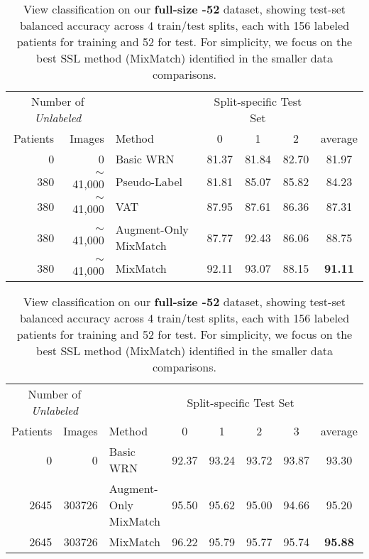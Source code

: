 \begin{table}[!h]
    \centering
    \begin{tabular}{r r l|ccc|c}
    \multicolumn{2}{c}{Number of \emph{Unlabeled}}
    	& 
    	& \multicolumn{3}{c}{Split-specific Test Set}
    \\
    Patients & Images & Method & 0  & 1 & 2 & average\\
    \hline
    0 & 0 & Basic WRN & 81.37 & 81.84 & 82.70 & 81.97\\
    380 & $\sim$41,000  & Pseudo-Label & 81.81 & 85.07 & 85.82 & 84.23\\
    380 &  $\sim$41,000  & VAT & 87.95 & 87.61 & 86.36 & 87.31\\
    380 &  $\sim$41,000  & Augment-Only MixMatch  & 87.77 & 92.43 & 86.06 & 88.75\\
    380 &  $\sim$41,000 & MixMatch & 92.11 & 93.07 & 88.15 & \textbf{91.11}
    \end{tabular}
    \caption{View classification on our \textbf{smaller -18} dataset, showing test-set balanced accuracy across 3 separate train/test splits each with 18 labeled patients for training and 18 for test.
    }%
    \label{tab:view classification small}
\bigskip

    \begin{tabular}{r r l|cccc|c}
    \multicolumn{2}{c}{Number of \emph{Unlabeled}}
    	& 
    	& \multicolumn{4}{c}{Split-specific Test Set}
    \\
    Patients & Images & Method & 0  & 1 & 2 & 3 & average\\
    \hline
	0 & 0 & Basic WRN & 92.37 & 93.24 & 93.72 & 93.87 & 93.30\\
    2645 & 303726 & Augment-Only MixMatch & 95.50 & 95.62 & 95.00 & 94.66 & 95.20\\
    2645 & 303726  & MixMatch & 96.22 & 95.79 & 95.77 & 95.74 & \textbf{95.88}
    \end{tabular}
    \caption{View classification on our \textbf{full-size -52} dataset, showing test-set balanced accuracy across 4 train/test splits, each with 156 labeled patients for training and 52 for test.
        For simplicity, we focus on the best SSL method (MixMatch) identified in the smaller data comparisons.
    }%
    \label{tab:view classification large}
\end{table}



